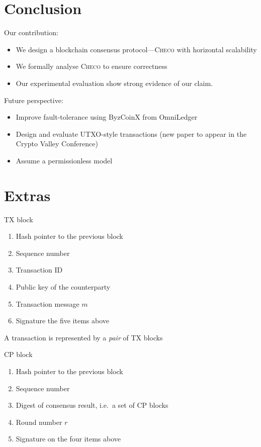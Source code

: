 \documentclass{beamer}
\begin{document}
\section{Conclusion}
\begin{frame}{\secname}
    Our contribution:
  \begin{itemize}
      \item We design a blockchain consensus protocol---\textsc{Checo} with horizontal scalability
      \item We formally analyse \textsc{Checo} to ensure correctness
      \item Our experimental evaluation show strong evidence of our claim.
  \end{itemize}
      Future perspective:
  \begin{itemize}
      \item Improve fault-tolerance using ByzCoinX from OmniLedger
      \item Design and evaluate UTXO-style transactions (new paper to appear in the Crypto Valley Conference)
      \item Assume a permissionless model
  \end{itemize}
\end{frame}


\section*{Extras}
\begin{frame}[noframenumbering]{TX block}
  \begin{enumerate}
    \item Hash pointer to the previous block
    \item Sequence number
    \item Transaction ID
    \item Public key of the counterparty
    \item Transaction message $m$
    \item Signature the five items above
  \end{enumerate}
  \vfill
  A transaction is represented by a \emph{pair} of TX blocks
\end{frame}

\begin{frame}[noframenumbering]{CP block}
  \begin{enumerate}
    \item Hash pointer to the previous block
    \item Sequence number
    \item Digest of consensus result, i.e.~a set of CP blocks
    \item Round number $r$
    \item Signature on the four items above
  \end{enumerate}
\end{frame}
\end{document}
